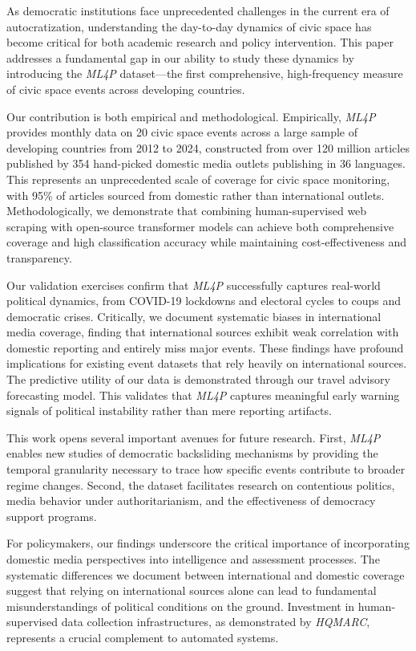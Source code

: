 \documentclass[
  letterpaper,
  DIV=11,
  numbers=noendperiod]{scrartcl}
\begin{document}
As democratic institutions face unprecedented challenges in the current
era of autocratization, understanding the day-to-day dynamics of civic
space has become critical for both academic research and policy
intervention. This paper addresses a fundamental gap in our ability to
study these dynamics by introducing the \emph{ML4P} dataset---the first
comprehensive, high-frequency measure of civic space events across
developing countries.

Our contribution is both empirical and methodological. Empirically,
\emph{ML4P} provides monthly data on 20 civic space events across a
large sample of developing countries from 2012 to 2024, constructed from
over 120 million articles published by 354 hand-picked domestic media
outlets publishing in 36 languages. This represents an unprecedented
scale of coverage for civic space monitoring, with 95\% of articles
sourced from domestic rather than international outlets.
Methodologically, we demonstrate that combining human-supervised web
scraping with open-source transformer models can achieve both
comprehensive coverage and high classification accuracy while
maintaining cost-effectiveness and transparency.

Our validation exercises confirm that \emph{ML4P} successfully captures
real-world political dynamics, from COVID-19 lockdowns and electoral
cycles to coups and democratic crises. Critically, we document
systematic biases in international media coverage, finding that
international sources exhibit weak correlation with domestic reporting
and entirely miss major events. These findings have profound
implications for existing event datasets that rely heavily on
international sources. The predictive utility of our data is
demonstrated through our travel advisory forecasting model. This
validates that \emph{ML4P} captures meaningful early warning signals of
political instability rather than mere reporting artifacts.

This work opens several important avenues for future research. First,
\emph{ML4P} enables new studies of democratic backsliding mechanisms by
providing the temporal granularity necessary to trace how specific
events contribute to broader regime changes. Second, the dataset
facilitates research on contentious politics, media behavior under
authoritarianism, and the effectiveness of democracy support programs.

For policymakers, our findings underscore the critical importance of
incorporating domestic media perspectives into intelligence and
assessment processes. The systematic differences we document between
international and domestic coverage suggest that relying on
international sources alone can lead to fundamental misunderstandings of
political conditions on the ground. Investment in human-supervised data
collection infrastructures, as demonstrated by \emph{HQMARC}, represents
a crucial complement to automated systems.
\end{document}
